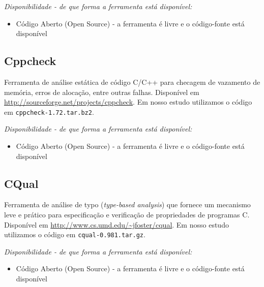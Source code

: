 \begin{description}

  \item {\it Disponibilidade - de que forma a ferramenta está disponível:}
    \begin{itemize}
      \item Código Aberto (Open Source) - a ferramenta é livre e o código-fonte está disponível
    \end{itemize}

\end{description}

\subsection{Cppcheck}

Ferramenta de análise estática de código C/C++ para checagem de vazamento de
memória, erros de alocação, entre outras falhas. Disponível em
\url{http://sourceforge.net/projects/cppcheck}. Em nosso estudo utilizamos o
código em \texttt{cppcheck-1.72.tar.bz2}.

\begin{description}

  \item {\it Disponibilidade - de que forma a ferramenta está disponível:}
    \begin{itemize}
      \item Código Aberto (Open Source) - a ferramenta é livre e o código-fonte está disponível
    \end{itemize}

\end{description}

\subsection{CQual}

Ferramenta de análise de typo ({\it type-based analysis}) que fornece um
mecanismo leve e prático para especificação e verificação de propriedades de
programas C. Disponível em \url{http://www.cs.umd.edu/~jfoster/cqual}. Em
nosso estudo utilizamos o código em \texttt{cqual-0.981.tar.gz}.

\begin{description}

  \item {\it Disponibilidade - de que forma a ferramenta está disponível:}
    \begin{itemize}
      \item Código Aberto (Open Source) - a ferramenta é livre e o código-fonte está disponível
    \end{itemize}

\end{description}

